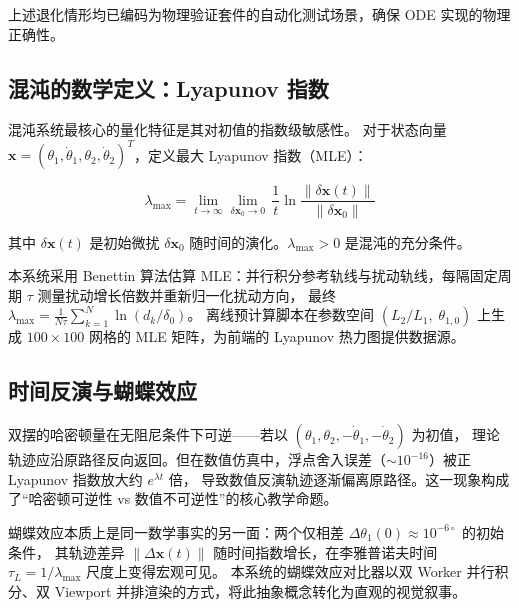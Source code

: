 上述退化情形均已编码为物理验证套件的自动化测试场景，确保 ODE 实现的物理正确性。

\subsection{混沌的数学定义：Lyapunov 指数}

混沌系统最核心的量化特征是其对初值的指数级敏感性。\linebreak
对于状态向量 $\mathbf{x} = (\theta_1,\dot{\theta}_1,\theta_2,\dot{\theta}_2)^T$，定义最大 Lyapunov 指数（MLE）：

\begin{equation}
  \lambda_{\max} = \lim_{t\to\infty}\lim_{\delta\mathbf{x}_0\to 0}\,\frac{1}{t}\ln\frac{\|\delta\mathbf{x}(t)\|}{\|\delta\mathbf{x}_0\|}
\label{eq:lyapunov_def}
\end{equation}

其中 $\delta\mathbf{x}(t)$ 是初始微扰 $\delta\mathbf{x}_0$ 随时间的演化。$\lambda_{\max} > 0$ 是混沌的充分条件。

本系统采用 Benettin 算法估算 MLE：并行积分参考轨线与扰动轨线，每隔固定周期 $\tau$ 测量扰动增长倍数并重新归一化扰动方向，
最终 $\lambda_{\max} = \frac{1}{N\tau}\sum_{k=1}^{N}\ln(d_k/\delta_0)$。
离线预计算脚本在参数空间 $(L_2/L_1,\;\theta_{1,0})$ 上生成 $100 \times 100$ 网格的 MLE 矩阵，为前端的 Lyapunov 热力图提供数据源。

\subsection{时间反演与蝴蝶效应}

双摆的哈密顿量在无阻尼条件下可逆——若以 $(\theta_1, \theta_2, -\dot{\theta}_1, -\dot{\theta}_2)$ 为初值，
理论轨迹应沿原路径反向返回。但在数值仿真中，浮点舍入误差（$\sim 10^{-16}$）被正 Lyapunov 指数放大约 $e^{\lambda t}$ 倍，
导致数值反演轨迹逐渐偏离原路径。这一现象构成了“哈密顿可逆性 vs 数值不可逆性”的核心教学命题。

蝴蝶效应本质上是同一数学事实的另一面：两个仅相差 $\Delta\theta_1(0) \approx 10^{-6\circ}$ 的初始条件，
其轨迹差异 $\|\Delta\mathbf{x}(t)\|$ 随时间指数增长，在李雅普诺夫时间 $\tau_L = 1/\lambda_{\max}$ 尺度上变得宏观可见。
本系统的蝴蝶效应对比器以双 Worker 并行积分、双 Viewport 并排渲染的方式，将此抽象概念转化为直观的视觉叙事。

\endinput
